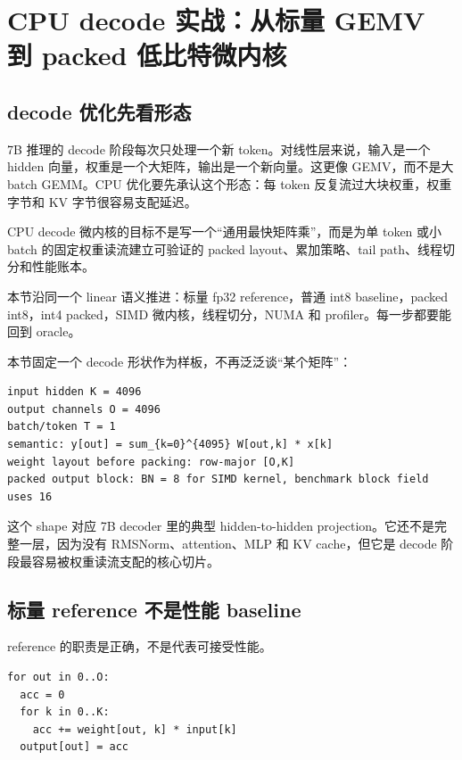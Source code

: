 \section{CPU decode 实战：从标量 GEMV 到 packed 低比特微内核}

\subsection{decode 优化先看形态}

7B 推理的 decode 阶段每次只处理一个新 token。对线性层来说，输入是一个 hidden 向量，权重是一个大矩阵，输出是一个新向量。这更像 GEMV，而不是大 batch GEMM。CPU 优化要先承认这个形态：每 token 反复流过大块权重，权重字节和 KV 字节很容易支配延迟。

\begin{keyidea}
CPU decode 微内核的目标不是写一个“通用最快矩阵乘”，而是为单 token 或小 batch 的固定权重读流建立可验证的 packed layout、累加策略、tail path、线程切分和性能账本。
\end{keyidea}

本节沿同一个 linear 语义推进：标量 fp32 reference，普通 int8 baseline，packed int8，int4 packed，SIMD 微内核，线程切分，NUMA 和 profiler。每一步都要能回到 oracle。

本节固定一个 decode 形状作为样板，不再泛泛谈“某个矩阵”：

\begin{lstlisting}[numbers=none,caption={CPU decode 样板形状}]
input hidden K = 4096
output channels O = 4096
batch/token T = 1
semantic: y[out] = sum_{k=0}^{4095} W[out,k] * x[k]
weight layout before packing: row-major [O,K]
packed output block: BN = 8 for SIMD kernel, benchmark block field uses 16
\end{lstlisting}

这个 shape 对应 7B decoder 里的典型 hidden-to-hidden projection。它还不是完整一层，因为没有 RMSNorm、attention、MLP 和 KV cache，但它是 decode 阶段最容易被权重读流支配的核心切片。

\subsection{标量 reference 不是性能 baseline}

reference 的职责是正确，不是代表可接受性能。

\begin{lstlisting}[numbers=none,caption={fp32 reference GEMV}]
for out in 0..O:
  acc = 0
  for k in 0..K:
    acc += weight[out, k] * input[k]
  output[out] = acc
\end{lstlisting}

